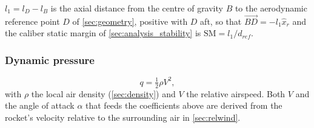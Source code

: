 $l_1=l_D-l_B$ is the axial distance from the centre of gravity $B$ to the
aerodynamic reference point $D$ of \autoref{sec:geometry}, positive with $D$ aft, so that
$\vec{BD}=-l_1\hat{x}_r$ and the caliber static margin of \autoref{sec:analysis_stability} is
$\mathrm{SM}=l_1/d_{ref}$.

\subsubsection{Dynamic pressure}
\begin{equation}
    q = \tfrac12\rho V^2,
\end{equation}
with $\rho$ the local air density (\autoref{sec:density}) and $V$ the relative airspeed. Both $V$
and the angle of attack $\alpha$ that feeds the coefficients above are derived from the rocket's
velocity relative to the surrounding air in \autoref{sec:relwind}.

